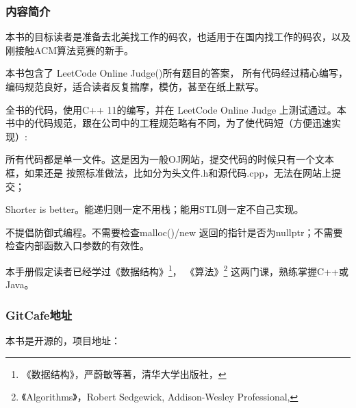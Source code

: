 \subsubsection{内容简介}
本书的目标读者是准备去北美找工作的码农，也适用于在国内找工作的码农，以及刚接触ACM算法竞赛的新手。

本书包含了 LeetCode Online Judge()所有题目的答案，
所有代码经过精心编写，编码规范良好，适合读者反复揣摩，模仿，甚至在纸上默写。

全书的代码，使用C++ 11的编写，并在 LeetCode Online Judge 上测试通过。本书中的代码规范，跟在公司中的工程规范略有不同，为了使代码短（方便迅速实现）:

\begindot
\item 所有代码都是单一文件。这是因为一般OJ网站，提交代码的时候只有一个文本框，如果还是
按照标准做法，比如分为头文件.h和源代码.cpp，无法在网站上提交；

\item Shorter is better。能递归则一定不用栈；能用STL则一定不自己实现。

\item 不提倡防御式编程。不需要检查malloc()/new 返回的指针是否为nullptr；不需要检查内部函数入口参数的有效性。
\myenddot

本手册假定读者已经学过《数据结构》\footnote{《数据结构》，严蔚敏等著，清华大学出版社，
}，
《算法》\footnote{《Algorithms》，Robert Sedgewick, Addison-Wesley Professional, }
这两门课，熟练掌握C++或Java。

\subsubsection{GitCafe地址}
本书是开源的，项目地址：

